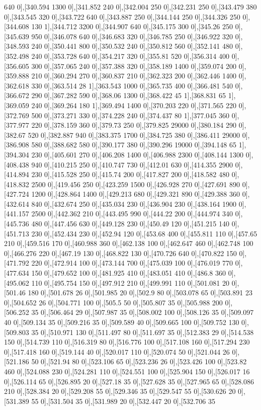 {640 0],[340.594 1300 0],[341.852 240 0],[342.004 250 0],[342.231 250 0],[343.479 380 0],[343.545 320 0],[343.722 640 0],[343.887 250 0],[344.144 250 0],[344.326 250 0],[344.608 130 1],[344.712 3200 0],[344.907 640 0],[345.175 300 0],[345.26 250 0],[345.639 950 0],[346.078 640 0],[346.683 320 0],[346.785 250 0],[346.922 320 0],[348.593 240 0],[350.441 800 0],[350.532 240 0],[350.812 560 0],[352.141 480 0],[352.498 240 0],[353.728 640 0],[354.217 320 0],[355.81 520 0],[356.314 400 0],[356.605 300 0],[357.065 240 0],[357.388 320 0],[358.189 1400 0],[359.074 200 0],[359.888 210 0],[360.294 270 0],[360.837 210 0],[362.323 200 0],[362.446 1400 0],[362.618 330 0],[363.514 28 1],[363.543 1000 0],[365.735 400 0],[366.481 540 0],[366.672 290 0],[367.282 590 0],[368.06 1300 0],[368.422 45 1],[368.831 65 1],[369.059 240 0],[369.264 180 1],[369.494 1400 0],[370.203 220 0],[371.565 220 0],[372.769 500 0],[373.271 330 0],[374.228 240 0],[374.437 80 1],[377.045 360 0],[377.977 220 0],[378.159 360 0],[379.73 250 0],[379.825 29000 0],[380.184 290 0],[382.67 520 0],[382.887 940 0],[383.375 1700 0],[384.725 380 0],[386.411 29000 0],[386.908 580 0],[388.682 580 0],[390.177 380 0],[390.296 19000 0],[394.148 65 1],[394.304 230 0],[405.601 270 0],[406.208 1400 0],[406.988 2300 0],[408.144 1300 0],[408.438 940 0],[410.215 250 0],[410.747 730 0],[412.01 630 0],[414.355 2900 0],[414.894 230 0],[415.528 250 0],[415.74 200 0],[417.827 200 0],[418.582 480 0],[418.832 2500 0],[419.456 250 0],[423.259 1500 0],[426.928 270 0],[427.691 890 0],[427.724 1200 0],[428.864 1400 0],[429.213 680 0],[429.321 890 0],[429.388 360 0],[432.614 840 0],[432.674 250 0],[435.034 230 0],[436.904 230 0],[438.164 1900 0],[441.157 2500 0],[442.362 210 0],[443.495 990 0],[444.22 200 0],[444.974 340 0],[445.736 480 0],[447.456 630 0],[449.128 230 0],[450.49 120 0],[451.215 140 0],[451.713 230 0],[452.434 230 0],[452.94 120 0],[453.68 400 0],[455.811 110 0],[457.65 210 0],[459.516 170 0],[460.988 360 0],[462.138 100 0],[462.647 460 0],[462.748 100 0],[466.276 220 0],[467.19 130 0],[468.822 130 0],[470.726 640 0],[470.822 150 0],[471.792 220 0],[472.914 100 0],[473.144 700 0],[475.039 100 0],[476.019 770 0],[477.634 150 0],[479.652 100 0],[481.925 410 0],[483.051 410 0],[486.8 360 0],[495.062 110 0],[495.754 150 0],[497.912 210 0],[499.991 110 0],[501.081 20 0],[501.46 180 0],[501.678 26 0],[501.985 20 0],[502.9 80 0],[503.078 65 0],[503.891 23 0],[504.652 26 0],[504.771 100 0],[505.5 50 0],[505.807 35 0],[505.988 200 0],[506.252 35 0],[506.464 29 0],[507.987 35 0],[508.002 100 0],[508.126 35 0],[509.097 40 0],[509.134 35 0],[509.216 35 0],[509.589 40 0],[509.665 100 0],[509.752 130 0],[509.803 35 0],[510.971 130 0],[511.497 80 0],[511.697 35 0],[512.383 29 0],[514.538 150 0],[514.739 110 0],[516.319 80 0],[516.776 100 0],[517.108 160 0],[517.294 230 0],[517.418 160 0],[519.144 40 0],[520.017 110 0],[520.074 50 0],[521.044 26 0],[521.186 50 0],[521.94 80 0],[523.106 65 0],[523.236 26 0],[523.426 100 0],[523.82 460 0],[524.088 230 0],[524.281 110 0],[524.551 100 0],[525.904 150 0],[526.017 16 0],[526.114 65 0],[526.895 20 0],[527.18 35 0],[527.628 35 0],[527.965 65 0],[528.086 210 0],[528.384 20 0],[529.208 55 0],[529.346 35 0],[529.547 55 0],[530.626 20 0],[531.389 55 0],[531.504 35 0],[531.989 20 0],[532.447 20 0],[532.706 35 }

